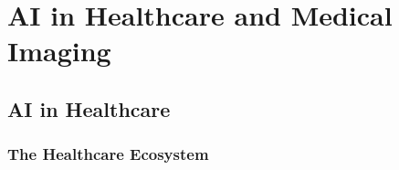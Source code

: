 \chapter{AI in Healthcare and Medical Imaging}

\section{AI in Healthcare}

\subsection{The Healthcare Ecosystem}

